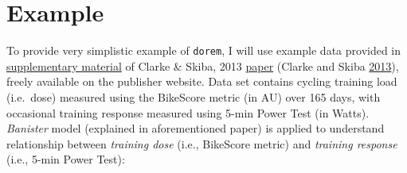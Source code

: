 \documentclass[
]{book}
\begin{document}
\hypertarget{example}{%
\section{Example}\label{example}}

To provide very simplistic example of \texttt{dorem}, I will use example data provided in \href{https://journals.physiology.org/doi/full/10.1152/advan.00078.2011m}{supplementary material} of Clarke \& Skiba, 2013 \href{https://journals.physiology.org/doi/full/10.1152/advan.00078.2011?}{paper} (Clarke and Skiba \protect\hyperlink{ref-clarkeRationaleResourcesTeaching2013}{2013}), freely available on the publisher website. Data set contains cycling training load (i.e.~dose) measured using the BikeScore metric (in AU) over 165 days, with occasional training response measured using 5-min Power Test (in Watts). \emph{Banister} model (explained in aforementioned paper) is applied to understand relationship between \emph{training dose} (i.e., BikeScore metric) and \emph{training response} (i.e., 5-min Power Test):
\end{document}
